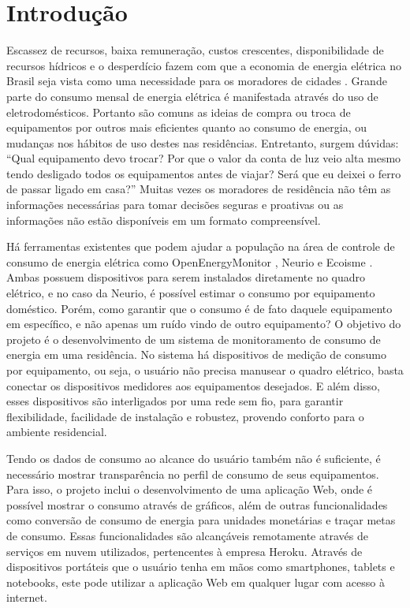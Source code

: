\chapter{Introdução}
\label{Cap:Introducao}
%
Escassez de recursos, baixa remuneração, custos crescentes, disponibilidade de recursos hídricos e o desperdício fazem com que a economia de energia elétrica no Brasil seja vista como uma necessidade para os moradores de cidades \cite{eflul}. Grande parte do consumo mensal de energia elétrica é manifestada através do uso de eletrodomésticos. Portanto são comuns as ideias de compra ou troca de equipamentos por outros mais eficientes quanto ao consumo de energia, ou mudanças nos hábitos de uso destes nas residências. Entretanto, surgem dúvidas: ``Qual equipamento devo trocar? Por que o valor da conta de luz veio alta mesmo tendo desligado todos os equipamentos antes de viajar? Será que eu deixei o ferro de passar ligado em casa?'' Muitas vezes os moradores de residência não têm as informações necessárias para tomar decisões seguras e proativas ou as informações não estão disponíveis em um formato compreensível. 

Há ferramentas existentes que podem ajudar a população na área de controle de consumo de energia elétrica como OpenEnergyMonitor \cite{open_energy_monitor}, Neurio \cite{neurio_site} e Ecoisme \cite{ecoisme_site}. Ambas possuem dispositivos para serem instalados diretamente no quadro elétrico, e no caso da Neurio, é possível estimar o consumo por equipamento doméstico. Porém, como garantir que o consumo é de fato daquele equipamento em específico, e não apenas um ruído vindo de outro equipamento? O objetivo do projeto é o desenvolvimento de um sistema de monitoramento de consumo de energia em uma residência. No sistema há dispositivos de medição de consumo por equipamento, ou seja, o usuário não precisa manusear o quadro elétrico, basta conectar os dispositivos medidores aos equipamentos desejados. E além disso, esses dispositivos são interligados por uma rede sem fio, para garantir flexibilidade, facilidade de instalação e robustez, provendo conforto para o ambiente residencial.

Tendo os dados de consumo ao alcance do usuário também não é suficiente, é necessário mostrar transparência no perfil de consumo de seus equipamentos. Para isso, o projeto inclui o desenvolvimento de uma aplicação Web, onde é possível mostrar o consumo através de gráficos, além de outras funcionalidades como conversão de consumo de energia para unidades monetárias e traçar metas de consumo. Essas funcionalidades são alcançáveis remotamente através de serviços em nuvem utilizados, pertencentes à empresa Heroku. Através de dispositivos portáteis que o usuário tenha em mãos como smartphones, tablets e notebooks, este pode utilizar a aplicação Web em qualquer lugar com acesso à internet. 

